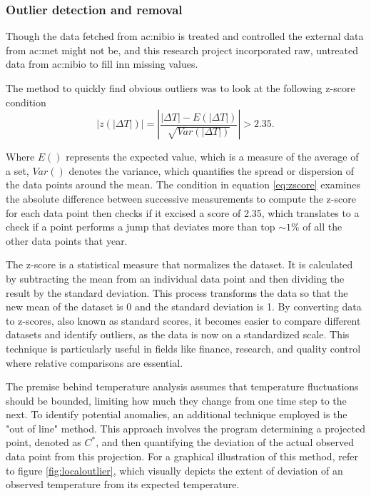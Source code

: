 \subsubsection{Outlier detection and removal}\label{sec:method:outlier}

Though the data fetched from \acrshort{ac:nibio} is treated and controlled the external data from \acrshort{ac:met} might not be, and this research project incorporated raw, untreated data from \acrshort{ac:nibio} to fill inn missing values.

The method to quickly find obvious outliers was to look at the following z-score condition
\begin{equation}
	|z(|\Delta T|)| = \left|\frac{|\Delta T|-E(|\Delta T|)}{\sqrt{Var(|\Delta T|)}}\right|> 2.35.\label{eq:zscore}
\end{equation}

Where $ E() $ represents the expected value, which is a measure of the average of a set, $ Var() $ denotes the variance, which quantifies the spread or dispersion of the data points around the mean. The condition in equation \ref{eq:zscore} examines the absolute difference between successive measurements to compute the z-score for each data point then checks if it excised a score of 2.35, which translates to a check if a point performs a jump that deviates more than top $\sim 1\%$ of all the other data points that year. 


The z-score is a statistical measure that normalizes the dataset. It is calculated by subtracting the mean from an individual data point and then dividing the result by the standard deviation. This process transforms the data so that the new mean of the dataset is 0 and the standard deviation is 1. By converting data to z-scores, also known as standard scores, it becomes easier to compare different datasets and identify outliers, as the data is now on a standardized scale. This technique is particularly useful in fields like finance, research, and quality control where relative comparisons are essential. 

The premise behind temperature analysis assumes that temperature fluctuations should be bounded, limiting how much they change from one time step to the next. To identify potential anomalies, an additional technique employed is the "out of line" method. This approach involves the program determining a projected point, denoted as $ C^* $, and then quantifying the deviation of the actual observed data point from this projection. For a graphical illustration of this method, refer to figure \ref{fig:localoutlier}, which visually depicts the extent of deviation of an observed temperature from its expected temperature. 

